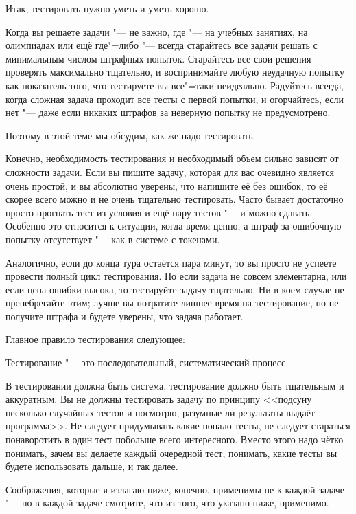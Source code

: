 \documentclass[a4paper,10pt]{problems}
\begin{document}
Итак, тестировать нужно уметь и уметь хорошо.

Когда вы решаете задачи "--- не важно, где "--- на учебных занятиях, на олимпиадах или ещё где"=либо "--- всегда старайтесь все задачи решать с минимальным числом штрафных попыток. Старайтесь все свои решения проверять максимально тщательно, и воспринимайте любую неудачную попытку как показатель того, что тестируете вы все"=таки неидеально. Радуйтесь всегда, когда сложная задача проходит все тесты с первой попытки, и огорчайтесь, если нет "--- даже если никаких штрафов за неверную попытку не предусмотрено.

Поэтому в этой теме мы обсудим, как же надо тестировать.

Конечно, необходимость тестирования и необходимый объем сильно зависят от сложности задачи. 
Если вы пишите задачу, которая для вас очевидно является очень простой, и вы абсолютно уверены, что напишите её без ошибок, 
то её скорее всего можно и не очень тщательно тестировать. 
Часто бывает достаточно просто прогнать тест из условия и ещё пару тестов "--- и можно сдавать. 
Особенно это относится к ситуации, когда время ценно, а штраф за ошибочную попытку отсутствует "--- как в системе с токенами.

Аналогично, если до конца тура остаётся пара минут, то вы просто не успеете провести полный цикл тестирования. 
Но если задача не совсем элементарна, или если цена ошибки высока, то тестируйте задачу тщательно. Ни в коем случае не пренебрегайте этим; 
лучше вы потратите лишнее время на тестирование, но не получите штрафа и будете уверены, что задача работает.

Главное правило тестирования следующее:

\begin{framed}
Тестирование "--- это последовательный, систематический процесс.
\end{framed}

В тестировании должна быть система, тестирование должно быть тщательным и аккуратным. 
Вы не должны тестировать задачу по принципу <<подсуну несколько случайных тестов и посмотрю, разумные ли результаты выдаёт программа>>. 
Не следует придумывать какие попало тесты, не следует стараться понаворотить в один тест побольше всего интересного. 
Вместо этого надо чётко понимать, зачем вы делаете каждый очередной тест, понимать, какие тесты вы будете использовать дальше, и так далее.

Соображения, которые я излагаю ниже, конечно, применимы не к каждой задаче "--- но в каждой задаче смотрите, что из того, что указано ниже, применимо.
\end{document}
